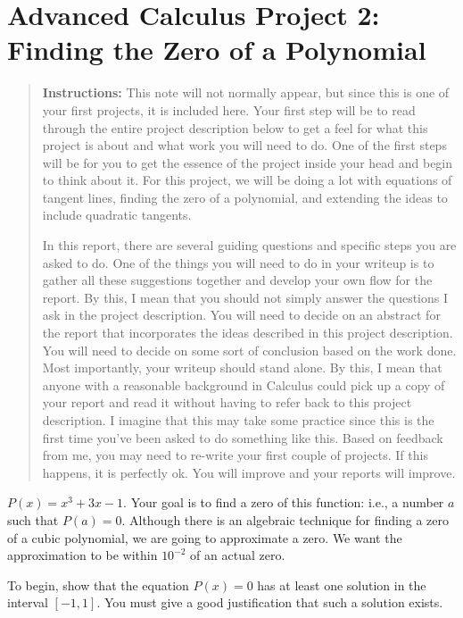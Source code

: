 \documentclass
[justified,nohyper]
{tufte-handout}
\theoremstyle{mydef}
\begin{document}
\section{Advanced Calculus Project 2: Finding the Zero of a Polynomial}

\begin{quote}
\textbf{Instructions:} This note will not normally appear, but since this is one of your first projects, it is included here. Your first step will be to read through the entire project description below to get a feel for what this project is about and what work you will need to do. One of the first steps will be for you to get the essence of the project inside your head and begin to think about it. For this project, we will be doing a lot with equations of tangent lines, finding the zero of a polynomial, and extending the ideas to include quadratic tangents.

In this report, there are several guiding questions and specific steps you are asked to do. One of the things you will need to do in your writeup is to gather all these suggestions together and develop your own flow for the report. By this, I mean that you should not simply answer the questions I ask in the project description. You will need to decide on an abstract for the report that incorporates the ideas described in this project description. You will need to decide on some sort of conclusion based on the work done. Most importantly, your writeup should stand alone. By this, I mean that anyone with a reasonable background in Calculus could pick up a copy of your report and read it without having to refer back to this project description. I imagine that this may take some practice since this is the first time you've been asked to do something like this. Based on feedback from me, you may need to re-write your first couple of projects. If this happens, it is perfectly ok. You will improve and your reports will improve.
\end{quote}

 $P(x)=x^3+3x-1$. Your goal is to find a zero of this function: i.e., a number $a$ such that $P(a)=0$. Although there is an algebraic technique for finding a zero of a cubic polynomial, we are going to approximate a zero. We want the approximation to be within $10^{-2}$ of an actual zero.

To begin, show that the equation $P(x)=0$ has at least one solution in the interval $[-1,1]$. You must give a good justification that such a solution exists.
\end{document}
